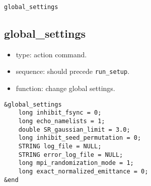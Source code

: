 \documentclass[11pt]{article}
\begin{document}
\newpage
\begin{center}{\Large\verb|global_settings|}\end{center}
\subsection{global\_settings \label{subsec:globalsettings}}

\begin{itemize}
\item type: action command.  
\item sequence: should precede \verb|run_setup|.
\item function: change global settings.
\end{itemize}

\begin{verbatim}
&global_settings
    long inhibit_fsync = 0;
    long echo_namelists = 1;
    double SR_gaussian_limit = 3.0;
    long inhibit_seed_permutation = 0;
    STRING log_file = NULL;
    STRING error_log_file = NULL;
    long mpi_randomization_mode = 1;
    long exact_normalized_emittance = 0;
&end
\end{verbatim}
\end{document}
